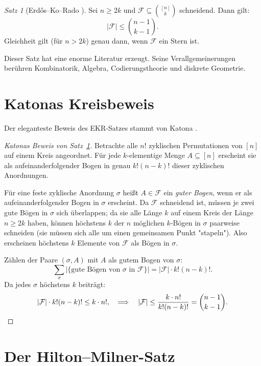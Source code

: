 \documentclass[12pt,a4paper]{amsart}
\theoremstyle{definition}
\theoremstyle{remark}
\newtheorem{satz}[theorem]{Satz}
\begin{document}
\begin{satz}[Erdős--Ko--Rado \cite{ErdosKoRado1961}]\label{satz:ekr}
Sei $n \geq 2k$ und $\mathcal{F} \subseteq \binom{[n]}{k}$ schneidend. Dann gilt:
\[
  |\mathcal{F}| \leq \binom{n-1}{k-1}.
\]
Gleichheit gilt (für $n > 2k$) genau dann, wenn $\mathcal{F}$ ein Stern ist.
\end{satz}

Dieser Satz hat eine enorme Literatur erzeugt. Seine Verallgemeinerungen berühren
Kombinatorik, Algebra, Codierungstheorie und diskrete Geometrie.

\section{Katonas Kreisbeweis}\label{sec:katona}

Der eleganteste Beweis des EKR-Satzes stammt von Katona \cite{Katona1972}.

\begin{proof}[Katonas Beweis von Satz~\ref{satz:ekr}]
Betrachte alle $n!$ zyklischen Permutationen von $[n]$ auf einem Kreis angeordnet.
Für jede $k$-elementige Menge $A \subseteq [n]$ erscheint sie als aufeinanderfolgender
Bogen in genau $k!(n-k)!$ dieser zyklischen Anordnungen.

Für eine feste zyklische Anordnung $\sigma$ heißt $A \in \mathcal{F}$ ein
\emph{guter Bogen}, wenn er als aufeinanderfolgender Bogen in $\sigma$ erscheint.
Da $\mathcal{F}$ schneidend ist, müssen je zwei gute Bögen in $\sigma$ sich
überlappen; da sie alle Länge $k$ auf einem Kreis der Länge $n \geq 2k$ haben,
können höchstens $k$ der $n$ möglichen $k$-Bögen in $\sigma$ paarweise schneiden
(sie müssen sich alle um einen gemeinsamen Punkt "stapeln"). Also erscheinen
höchstens $k$ Elemente von $\mathcal{F}$ als Bögen in $\sigma$.

Zählen der Paare $(\sigma, A)$ mit $A$ als gutem Bogen von $\sigma$:
\[
  \sum_\sigma |\{\text{gute Bögen von } \sigma \text{ in } \mathcal{F}\}|
  = |\mathcal{F}| \cdot k!(n-k)!.
\]
Da jedes $\sigma$ höchstens $k$ beiträgt:
\[
  |\mathcal{F}| \cdot k!(n-k)! \leq k \cdot n!,
  \quad\Longrightarrow\quad
  |\mathcal{F}| \leq \frac{k \cdot n!}{k!(n-k)!} = \binom{n-1}{k-1}.
\qedhere\]
\end{proof}

\section{Der Hilton--Milner-Satz}\label{sec:hilton_milner}
\end{document}
